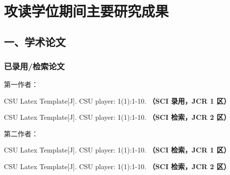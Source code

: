
{~}
\vspace{-9pt}
\section{攻读学位期间主要研究成果} %

\ifblindreview
\fi
\vspace{11pt}
\subsection*{一、学术论文}

\ifblindreview



\subsubsection*{已录用/检索论文}
第一作者：
\begin{enumerate}[label={[\arabic*]},itemindent=2em,wide]
	\item CSU Latex Template[J]. CSU player: 1(1):1-10. {\bfseries \heiti（SCI 录用，JCR 1 区）}
	\item CSU Latex Template[J]. CSU player: 1(1):1-10. {\bfseries \heiti（SCI 检索，JCR 2 区）}
\end{enumerate}
第二作者：
\begin{enumerate}[label={[\arabic*]},itemindent=2em,wide]
	\item CSU Latex Template[J]. CSU player: 1(1):1-10. {\bfseries \heiti（SCI 检索，JCR 1 区）}
	\item CSU Latex Template[J]. CSU player: 1(1):1-10. {\bfseries \heiti（SCI 检索，JCR 2 区）}
\end{enumerate}
